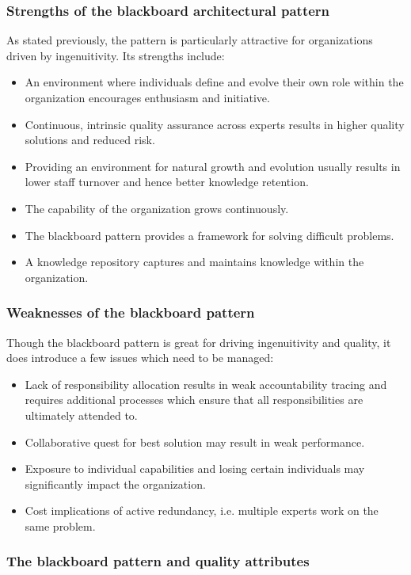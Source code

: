 \documentclass[11pt,english,a4]{article}
\begin{document}
\subsubsection{Strengths of the blackboard architectural pattern}

As stated previously, the pattern is particularly attractive for organizations driven by ingenuitivity. Its strengths include: 
\begin{itemize}
  \item An environment where individuals define and evolve their own role within the organization encourages enthusiasm and initiative.
  \item Continuous, intrinsic quality assurance across experts results in higher quality solutions and reduced risk.
  \item Providing an environment for natural growth and evolution usually results in lower staff turnover and hence better knowledge retention.
  \item The capability of the organization grows continuously.
  \item The blackboard pattern provides a framework for solving difficult problems.
  \item A knowledge repository captures and maintains knowledge within the organization.
\end{itemize}

\subsubsection{Weaknesses of the blackboard pattern}

Though the blackboard pattern is great for driving ingenuitivity and quality, it does introduce a few issues which need to be managed: 
\begin{itemize}
  \item Lack of responsibility allocation results in weak accountability tracing and requires additional processes which ensure that all responsibilities are ultimately attended to.
  \item Collaborative quest for best solution may result in weak performance.
  \item Exposure to individual capabilities and losing certain individuals may significantly impact the organization.
  \item Cost implications of active redundancy, i.e. multiple experts work on the same problem.
\end{itemize}

\subsubsection{The blackboard pattern and quality attributes}
\end{document}
